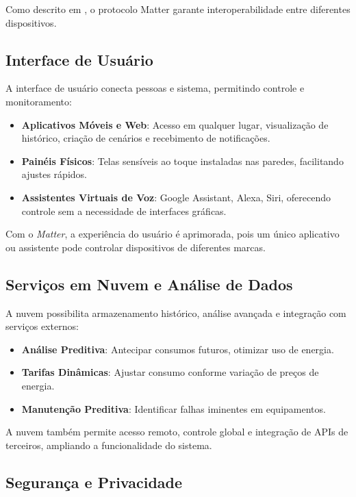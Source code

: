 Como descrito em \cite{matter_spec}, o protocolo Matter garante interoperabilidade entre diferentes dispositivos.

\subsection{Interface de Usuário}

A interface de usuário conecta pessoas e sistema, permitindo controle e monitoramento:

\begin{itemize}
    \item \textbf{Aplicativos Móveis e Web}: Acesso em qualquer lugar, visualização de histórico, criação de cenários e recebimento de notificações.
    \item \textbf{Painéis Físicos}: Telas sensíveis ao toque instaladas nas paredes, facilitando ajustes rápidos.
    \item \textbf{Assistentes Virtuais de Voz}: Google Assistant, Alexa, Siri, oferecendo controle sem a necessidade de interfaces gráficas.
\end{itemize}

Com o \textit{Matter}, a experiência do usuário é aprimorada, pois um único aplicativo ou assistente pode controlar dispositivos de diferentes marcas.

\subsection{Serviços em Nuvem e Análise de Dados}

A nuvem possibilita armazenamento histórico, análise avançada e integração com serviços externos:

\begin{itemize}
    \item \textbf{Análise Preditiva}: Antecipar consumos futuros, otimizar uso de energia.
    \item \textbf{Tarifas Dinâmicas}: Ajustar consumo conforme variação de preços de energia.
    \item \textbf{Manutenção Preditiva}: Identificar falhas iminentes em equipamentos.
\end{itemize}

A nuvem também permite acesso remoto, controle global e integração de APIs de terceiros, ampliando a funcionalidade do sistema.

\subsection{Segurança e Privacidade}


